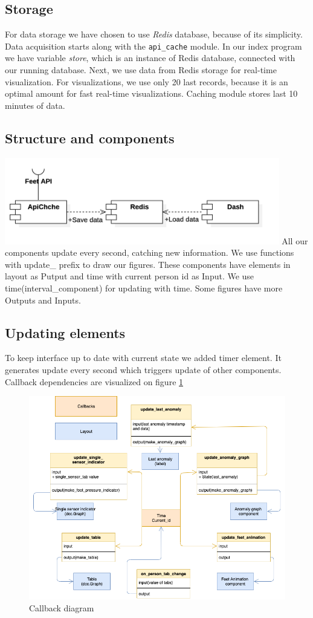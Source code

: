 \documentclass{article}
\begin{document}
\subsection{Storage}
For data storage we have chosen to use \textit{Redis} database, because of its simplicity. Data acquisition starts along with the \texttt{api\_cache} module. In our index program we have variable \textit{store}, which is an instance of Redis database, connected with our running database. Next, we use data from Redis storage for real-time visualization. For visualizations, we use only 20 last records, because it is an optimal amount for fast real-time visualizations. Caching module stores last 10 minutes of data.
\subsection{Structure and components}
\includegraphics[width=12cm]{MagicFeetComponents}
\newline
All our components update every second, catching new information. We use functions with update\_ prefix to draw our figures. These components have elements in layout as Putput and time with
current person id as Input. We use time(interval\_component) for updating with time. Some figures have more Outputs and Inputs.

\subsection{Updating elements}
To keep interface up to date with current state we added timer element. It generates update every second which triggers update of other components.
Callback dependencies are visualized on figure \ref{fig:callbacks}

\begin{figure}
    \caption{Callback diagram}
    \label{fig:callbacks}
    \centering
        \includegraphics[width=12cm]{callbacks}
  \end{figure}
\end{document}
